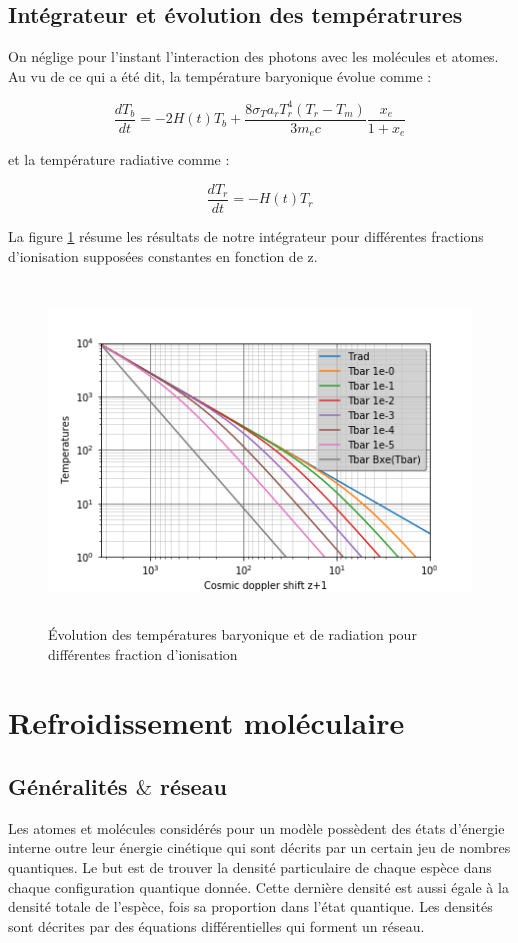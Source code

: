 \documentclass[10pt, a4paper]{report}
\numberwithin{equation}{subsection}
\begin{document}
\subsection{Intégrateur et évolution des températrures}
On néglige pour l'instant l'interaction des photons avec les molécules et atomes. Au vu de ce qui a été dit, la température baryonique évolue comme :

\begin{equation} \label{eq:EERT}
\boxed{\frac{dT_b}{dt} = -2H(t)T_b+\frac{8\sigma_Ta_rT_r^4(T_r-T_m)}{3m_ec}\frac{x_e}{1+x_e}}
\end{equation}

et la température radiative comme :

\begin{equation} \label{eq:EERR}
\boxed{\frac{dT_r}{dt} = -H(t)T_r}
\end{equation}

La figure \ref{fig:T} résume les résultats de notre intégrateur pour différentes fractions d’ionisation supposées constantes en fonction de z.

\begin{figure}[]
\centering
\includegraphics[width=12.0cm,height=9cm]{Temperatures.png}
\caption{\uppercase{é}volution des températures baryonique et de radiation pour différentes fraction d'ionisation}
\label{fig:T}
\end{figure}

\section{Refroidissement moléculaire}
\subsection{Généralités $\&$ réseau}
Les atomes et molécules considérés pour un modèle possèdent des états d'énergie interne outre leur énergie cinétique qui sont décrits par un certain jeu de nombres quantiques. Le but est de trouver la densité particulaire de chaque espèce dans chaque configuration quantique donnée. Cette dernière densité est aussi égale à la densité totale de l'espèce, fois sa proportion dans l'état quantique. Les densités sont décrites par des équations différentielles qui forment un réseau.\bigskip
\large
\end{document}
